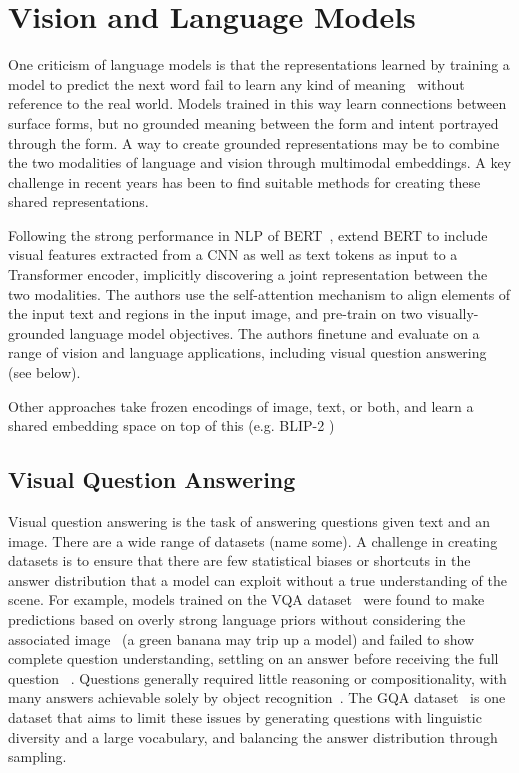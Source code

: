 \section{Vision and Language Models}
\label{sec:vlm}

One criticism of language models is that the representations learned by
training a model to predict the next word fail to learn any kind of
meaning~\citep{bender2020climbing} without reference to the real world. Models
trained in this way learn connections between surface forms, but no grounded
meaning between the form and intent portrayed through the form. A way to create
grounded representations may be to combine the two modalities of language and
vision through multimodal embeddings. A key challenge in recent years has been
to find suitable methods for creating these shared representations.

Following the strong performance in NLP of BERT~\citep{devlin2019bert},
\citet{li2019visualbert} extend BERT to include visual features extracted from a
CNN as well as text tokens as input to a Transformer encoder, implicitly
discovering a joint representation between the two modalities. The authors use
the self-attention mechanism to align elements of the input text and regions in
the input image, and pre-train on two visually-grounded language model
objectives. The authors finetune and evaluate on a range of vision and language
applications, including visual question answering (see below).


Other approaches take frozen encodings of image, text, or both, and learn a
shared embedding space on top of this (e.g. BLIP-2 \citep{li2023blip2})



\subsection{Visual Question Answering}
\label{ssec:vqa}

Visual question answering is the task of answering questions given text and an
image. There are a wide range of datasets (name some). A challenge in creating
datasets is to ensure that there are few statistical biases or shortcuts in the
answer distribution that a model can exploit without a true understanding of
the scene. For example, models trained on the VQA dataset~\citep{antol2015vqa}
were found to make predictions based on overly strong language priors without
considering the associated image~\citep{zhang2016yin} (a green banana may trip
up a model) and failed to show complete question understanding, settling on an
answer before receiving the full question ~\citep{agrawal2016analyzing}.
Questions generally required little reasoning or compositionality, with many
answers achievable solely by object recognition~\citep{hudson2019gqa}. The GQA
dataset~\citep{hudson2019gqa} is one dataset that aims to limit these issues
by generating questions with linguistic diversity and a large vocabulary, and
balancing the answer distribution through sampling. 

